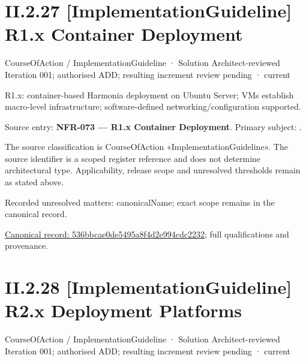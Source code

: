 \section*{II.2.27 [ImplementationGuideline] R1.x Container Deployment}
\label{navigation:II.2.27}

\label{element:536bbcae0de5495a8f4d2e994cdc2232}
{\small CourseOfAction / ImplementationGuideline · Solution Architect-reviewed Iteration 001; authorised ADD; resulting increment review pending · current}\par

R1.x: container-based Harmonia deployment on Ubuntu Server; VMs establish macro-level infrastructure; software-defined networking/configuration supported.



Source entry: \textbf{NFR-073 — R1.x Container Deployment}. Primary subject: \texttt{}.



The source classification is CourseOfAction «ImplementationGuideline». The source identifier is a scoped register reference and does not determine architectural type. Applicability, release scope and unresolved thresholds remain as stated above.


{\small Recorded unresolved matters: canonicalName; exact scope remains in the canonical record.}\par
{\footnotesize \href{../../../../continuum/strategy/course-of-action/implementation-guideline/536bbcae0de5495a8f4d2e994cdc2232.md}{Canonical record: 536bbcae0de5495a8f4d2e994cdc2232}; full qualifications and provenance.}\par
\section*{II.2.28 [ImplementationGuideline] R2.x Deployment Platforms}
\label{navigation:II.2.28}

\label{element:e1521c49b740487e935fa9ecd00675a0}
{\small CourseOfAction / ImplementationGuideline · Solution Architect-reviewed Iteration 001; authorised ADD; resulting increment review pending · current}\par

